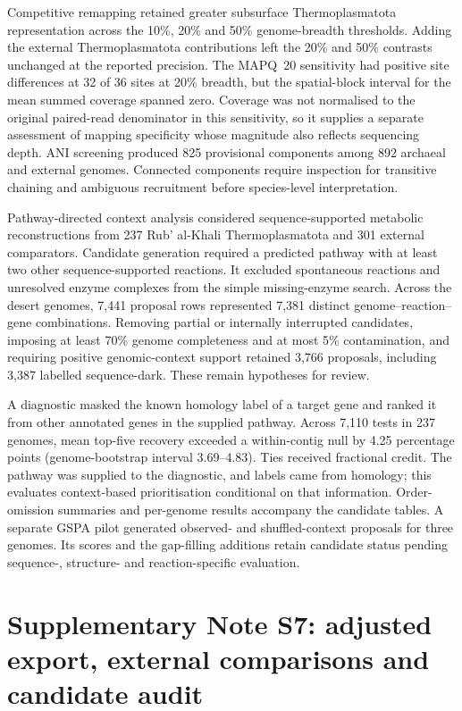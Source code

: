 Competitive remapping retained greater subsurface Thermoplasmatota representation across the 10\%, 20\% and 50\% genome-breadth thresholds. Adding the external Thermoplasmatota contributions left the 20\% and 50\% contrasts unchanged at the reported precision. The MAPQ~20 sensitivity had positive site differences at 32 of 36 sites at 20\% breadth, but the spatial-block interval for the mean summed coverage spanned zero. Coverage was not normalised to the original paired-read denominator in this sensitivity, so it supplies a separate assessment of mapping specificity whose magnitude also reflects sequencing depth. ANI screening produced 825 provisional components among 892 archaeal and external genomes. Connected components require inspection for transitive chaining and ambiguous recruitment before species-level interpretation.

Pathway-directed context analysis considered sequence-supported metabolic reconstructions from 237 Rub' al-Khali Thermoplasmatota and 301 external comparators. Candidate generation required a predicted pathway with at least two other sequence-supported reactions. It excluded spontaneous reactions and unresolved enzyme complexes from the simple missing-enzyme search. Across the desert genomes, 7,441 proposal rows represented 7,381 distinct genome--reaction--gene combinations. Removing partial or internally interrupted candidates, imposing at least 70\% genome completeness and at most 5\% contamination, and requiring positive genomic-context support retained 3,766 proposals, including 3,387 labelled sequence-dark. These remain hypotheses for review.

A diagnostic masked the known homology label of a target gene and ranked it from other annotated genes in the supplied pathway. Across 7,110 tests in 237 genomes, mean top-five recovery exceeded a within-contig null by 4.25 percentage points (genome-bootstrap interval 3.69--4.83). Ties received fractional credit. The pathway was supplied to the diagnostic, and labels came from homology; this evaluates context-based prioritisation conditional on that information. Order-omission summaries and per-genome results accompany the candidate tables. A separate GSPA pilot generated observed- and shuffled-context proposals for three genomes. Its scores and the gap-filling additions retain candidate status pending sequence-, structure- and reaction-specific evaluation.

\section*{Supplementary Note S7: adjusted export, external comparisons and candidate audit}

